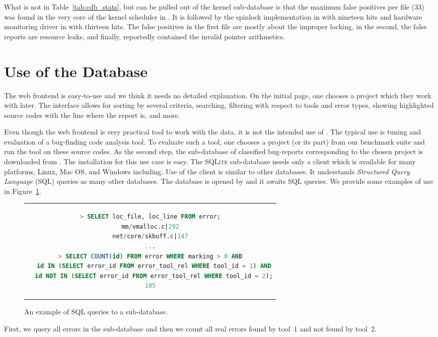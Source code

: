 What is not in Table~\ref{tab:cdb_stats}, but can be pulled out of the kernel
sub-database is that the maximum false positives per file (33) was found
in the very core of the kernel scheduler in . It is
followed by the spinlock implementation in  with
nineteen hits and hardware monitoring driver in 
with thirteen hits. The false positives in the first file are mostly about
the improper locking, in the second, the false reports are resource leaks, and
finally,  reportedly contained the invalid pointer arithmetics.


\section{Use of the Database}\label{sec:cdb_use}

The web frontend is easy-to-use and we think it needs no detailed explanation.
On the initial page, one chooses a project which they work with later. The
interface allows for sorting by several criteria, searching, filtering with
respect to tools and error types, showing highlighted source codes with the
line where the report is, and more.

Even though the web frontend is very practical tool to work with the data, it
is not the intended use of \cdb. The typical use is tuning and evaluation of a
bug-finding code analysis tool. To evaluate such a tool, one chooses a project
(or its part) from our benchmark suite and run the tool on these source codes.
As the second step, the sub-database of classified bug-reports corresponding
to the chosen project is downloaded from \cdb.  The installation for this use
case is easy. The \textsc{SQLite} sub-database needs only a client which is
available for many platforms, Linux, Mac OS, and Windows including.  Use of
the client is similar to other databases. It understands \emph{Structured
Query Language} (SQL) queries as many other databases. The database is opened
by  and it awaits SQL queries. We
provide some examples of use in Figure~\ref{fig:cdb_sql}.
\begin{figure}[htb]
  \begin{center}
  \begin{tabular}{c}
  \begin{lstlisting}[language=SQL, columns=flexible]
> SELECT loc_file, loc_line FROM error;
mm/vmalloc.c|292
net/core/skbuff.c|147
...
> SELECT COUNT(id) FROM error WHERE marking > 0 AND
  id IN (SELECT error_id FROM error_tool_rel WHERE tool_id = 1) AND
  id NOT IN (SELECT error_id FROM error_tool_rel WHERE tool_id = 2);
105
  \end{lstlisting}
  \end{tabular}
  \end{center}
    \caption{An example of SQL queries to a sub-database.}
    \label{fig:cdb_sql}
\end{figure}
First, we query all errors in the sub-database and then we count all real
errors found by tool~1 and not found by tool~2.

